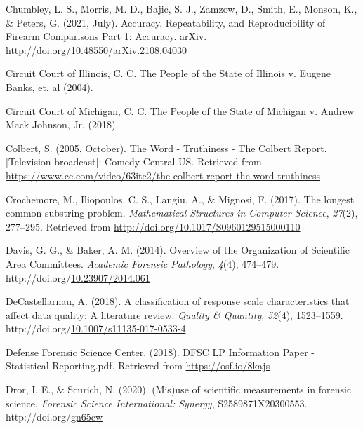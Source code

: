\documentclass[print]{nuthesis}
\newlength{\cslhangindent}
\newenvironment{CSLReferences}[2]%
{\setlength{\parindent}{0pt}%
\everypar{\setlength{\hangindent}{\cslhangindent}}\ignorespaces}%
{\par}
\begin{document}
\begin{CSLReferences}{1}{0}
\leavevmode{}%
Chumbley, L. S., Morris, M. D., Bajic, S. J., Zamzow, D., Smith, E., Monson, K., \& Peters, G. (2021, July). Accuracy, {Repeatability}, and {Reproducibility} of {Firearm} {Comparisons} {Part} 1: {Accuracy}. arXiv. http://doi.org/\href{https://doi.org/10.48550/arXiv.2108.04030}{10.48550/arXiv.2108.04030}

\leavevmode{}%
Circuit Court of Illinois, C. C. The {People} of the {State} of {Illinois} v. Eugene {Banks}, et. al (2004).

\leavevmode{}%
Circuit Court of Michigan, C. C. The {People} of the {State} of {Michigan} v. Andrew {Mack} {Johnson}, {Jr.} (2018).

\leavevmode{}%
Colbert, S. (2005, October). The {Word} - {Truthiness} - {The} {Colbert} {Report}. {[}Television broadcast{]}: {Comedy Central US}. Retrieved from \url{https://www.cc.com/video/63ite2/the-colbert-report-the-word-truthiness}

\leavevmode{}%
Crochemore, M., Iliopoulos, C. S., Langiu, A., \& Mignosi, F. (2017). The longest common substring problem. \emph{Mathematical Structures in Computer Science}, \emph{27}(2), 277--295. Retrieved from \url{http://doi.org/10.1017/S0960129515000110}

\leavevmode{}%
Davis, G. G., \& Baker, A. M. (2014). Overview of the {Organization} of {Scientific} {Area} {Committees}. \emph{Academic Forensic Pathology}, \emph{4}(4), 474--479. http://doi.org/\href{https://doi.org/10.23907/2014.061}{10.23907/2014.061}

\leavevmode{}%
DeCastellarnau, A. (2018). A classification of response scale characteristics that affect data quality: A literature review. \emph{Quality \& Quantity}, \emph{52}(4), 1523--1559. http://doi.org/\href{https://doi.org/10.1007/s11135-017-0533-4}{10.1007/s11135-017-0533-4}

\leavevmode{}%
Defense Forensic Science Center. (2018). {DFSC} {LP} {Information} {Paper} - {Statistical} {Reporting}.pdf. Retrieved from \url{https://osf.io/8kajs}

\leavevmode{}%
Dror, I. E., \& Scurich, N. (2020). ({Mis})use of scientific measurements in forensic science. \emph{Forensic Science International: Synergy}, S2589871X20300553. http://doi.org/\href{https://doi.org/gn65cw}{gn65cw}


\end{CSLReferences}
\end{document}

